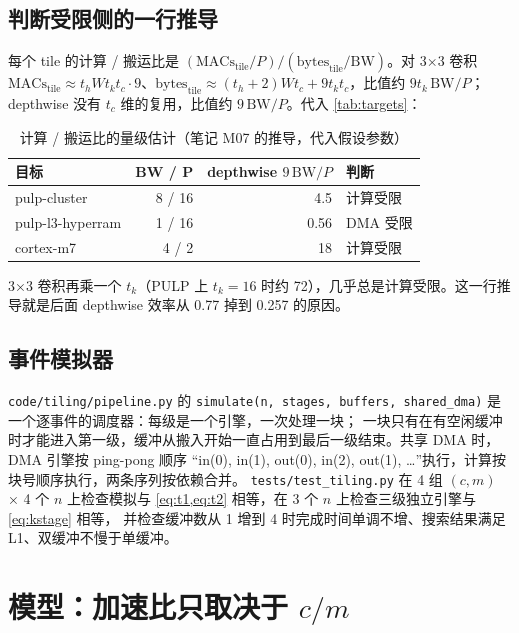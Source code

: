 \documentclass[11pt,a4paper]{ctexart}
\begin{document}
\subsection{判断受限侧的一行推导}

每个 tile 的计算 / 搬运比是 $(\text{MACs}_{\text{tile}}/P)/(\text{bytes}_{\text{tile}}/\text{BW})$。对 3×3 卷积
$\text{MACs}_{\text{tile}}\approx t_h W t_k t_c\cdot 9$、$\text{bytes}_{\text{tile}}\approx (t_h+2) W t_c + 9 t_k t_c$，比值约 $9 t_k\,\text{BW}/P$；
depthwise 没有 $t_c$ 维的复用，比值约 $9\,\text{BW}/P$。代入 \cref{tab:targets}：

\begin{table}[H]
\centering\small
\caption{计算 / 搬运比的量级估计（笔记 M07 的推导，代入假设参数）}\label{tab:ratio}
\begin{tabular}{lrrl}
\toprule
目标 & BW / P & depthwise $9\,\text{BW}/P$ & 判断 \\
\midrule
pulp-cluster & 8 / 16 & 4.5 & 计算受限 \\
pulp-l3-hyperram & 1 / 16 & 0.56 & DMA 受限 \\
cortex-m7 & 4 / 2 & 18 & 计算受限 \\
\bottomrule
\end{tabular}
\end{table}

3×3 卷积再乘一个 $t_k$（PULP 上 $t_k=16$ 时约 72），几乎总是计算受限。这一行推导就是后面 depthwise 效率从 0.77 掉到 0.257 的原因。

\subsection{事件模拟器}

\texttt{code/tiling/pipeline.py} 的 \texttt{simulate(n, stages, buffers, shared\_dma)} 是一个逐事件的调度器：每级是一个引擎，一次处理一块；
一块只有在有空闲缓冲时才能进入第一级，缓冲从搬入开始一直占用到最后一级结束。共享 DMA 时，DMA 引擎按 ping-pong 顺序
“in(0), in(1), out(0), in(2), out(1), …”执行，计算按块号顺序执行，两条序列按依赖合并。
\texttt{tests/test\_tiling.py} 在 4 组 $(c, m)$ × 4 个 $n$ 上检查模拟与 \cref{eq:t1,eq:t2} 相等，在 3 个 $n$ 上检查三级独立引擎与 \cref{eq:kstage} 相等，
并检查缓冲数从 1 增到 4 时完成时间单调不增、搜索结果满足 L1、双缓冲不慢于单缓冲。

\section{模型：加速比只取决于 $c/m$}\label{sec:model}
\end{document}
